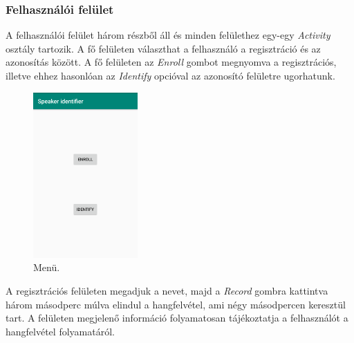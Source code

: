\subsubsection{Felhasználói felület}

 A felhasználói felület három részből áll és minden felülethez egy-egy \emph{Activity} osztály tartozik. A fő felületen választhat a felhasználó a regisztráció és az azonosítás között. A fő felületen az \emph{Enroll} gombot megnyomva a regisztrációs, illetve ehhez hasonlóan az \emph{Identify} opcióval az azonosító felületre ugorhatunk.


\begin{figure}[!ht]
	\centering
	\includegraphics[width=40mm, keepaspectratio]{figures/app-main-screen.png}
	\caption{Menü.}
	\label{fig:app-main-screen}
\end{figure}

A regisztrációs felületen megadjuk a nevet, majd a \emph{Record} gombra kattintva három másodperc múlva elindul a hangfelvétel, ami négy másodpercen keresztül tart. A felületen megjelenő információ folyamatosan tájékoztatja a felhasználót a hangfelvétel folyamatáról.

